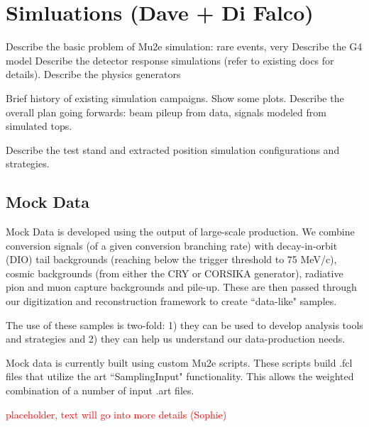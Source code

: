 \section{Simluations (Dave + Di Falco)}
\label{sec:simulation}
Describe the basic problem of Mu2e simulation: rare events, very
Describe the G4 model
Describe the detector response simulations (refer to existing docs for details).
Describe the physics generators

Brief history of existing simulation campaigns.  Show some plots.
Describe the overall plan going forwards: beam pileup from data, signals modeled from simulated tops.

Describe the test stand and extracted position simulation configurations and strategies.



\subsection{Mock Data}


Mock Data is developed using the output of large-scale production. We combine conversion signals (of a given conversion branching rate) with decay-in-orbit (DIO) tail backgrounds (reaching below the trigger threshold to 75 MeV/c), cosmic backgrounds (from either the CRY or CORSIKA generator), radiative pion and muon capture backgrounds and pile-up. These are then passed through our digitization and reconstruction framework to create ``data-like" samples.

The use of these samples is two-fold: 1) they can be used to develop analysis tools and strategies and 2) they can help us understand our data-production needs.

Mock data is currently built using custom Mu2e scripts. These scripts build .fcl files that utilize the art ``SamplingInput" functionality. This allows the weighted combination of a number of input .art files.


\textcolor{red}{placeholder, text will go into more details (Sophie)}

